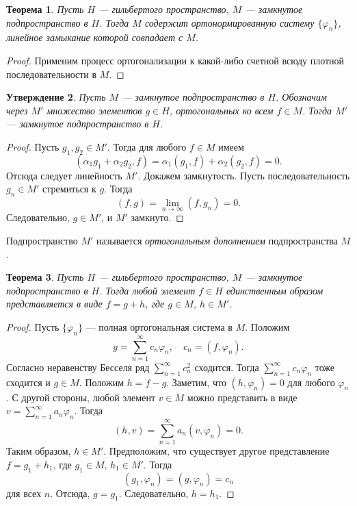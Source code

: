 \documentclass[12pt, titlepage, oneside]{amsbook}
\newtheorem{theorem}{Теорема}[chapter]
\newtheorem{claim}[theorem]{Утверждение}
\theoremstyle{definition}
\theoremstyle{remark}
\begin{document}
\begin{theorem}
	\label{Hil1}
	Пусть $H$ --- гильбертого пространство, $M$ --- замкнутое подпространство в $H$. Тогда $M$ содержит ортонормированную систему $\{\varphi_n\}$, линейное замыкание которой  совпадает с $M$.
\end{theorem}

\begin{proof}
	Применим процесс ортогонализации к какой-либо счетной всюду плотной последовательности в $M$.
\end{proof}

\begin{claim}
	\label{Hil2}
	Пусть $M$ --- замкнутое подпространство в $H$. Обозначим через $M'$ множество элементов $g\in H$, ортогональных ко всем $f\in M$. Тогда $M'$ --- замкнутое подпространство в $H$.
\end{claim}

\begin{proof}
	Пусть $g_1,g_2\in M'$. Тогда для любого $f\in M$ имеем $$(\alpha_1g_1+\alpha_2g_2,f)=\alpha_1(g_1,f)+\alpha_2(g_2,f)=0.$$ Отсюда следует линейность $M'$. Докажем замкнутость. Пусть последовательность $g_n\in M'$ стремиться к $g$. Тогда $$(f,g)=\lim\limits_{n\rightarrow\infty}(f,g_n)=0.$$ Следовательно, $g\in M'$, и $M'$ замкнуто.
\end{proof}

Подпространство $M'$ называется \emph{ортогональным дополнением} подпространства $M$.

\begin{theorem}
	\label{Hil3}
	Пусть $H$ --- гильбертого пространство, $M$ --- замкнутое подпространство в $H$. Тогда любой элемент $f\in H$ единственным образом представляется в виде $f=g+h$, где $g\in M$, $h\in M'$.
\end{theorem}

\begin{proof}
	Пусть $\{\varphi_n\}$ --- полная ортогональная система в $M$. Положим $$g=\sum\limits_{n=1}^{\infty} c_n\varphi_n,\quad c_n=(f,\varphi_n).$$ Согласно неравенству Бесселя ряд $\sum\limits_{n=1}^{\infty} c^2_n$ сходится. Тогда $\sum\limits_{n=1}^{\infty} c_n\varphi_n$ тоже сходится и $g\in M$. Положим $h=f-g$. Заметим, что $(h,\varphi_n)=0$ для любого $\varphi_n$. С другой стороны, любой элемент $v\in M$ можно представить в виде $v=\sum\limits_{n=1}^{\infty} a_n\varphi_n$. Тогда $$(h,v)=\sum\limits_{n=1}^{\infty} a_n(v,\varphi_n)=0.$$ Таким образом, $h\in M'$. Предположим, что существует другое представление $f=g_1+h_1$, где $g_1\in M$, $h_1\in M'$. Тогда $$(g_1,\varphi_n)=(g,\varphi_n)=c_n$$ для всех $n$. Отсюда, $g=g_1$. Следовательно, $h=h_1$.
\end{proof}
\end{document}

